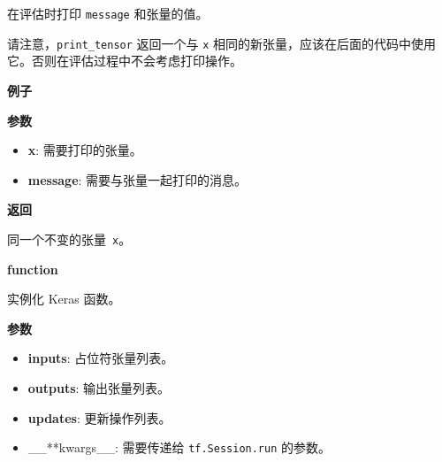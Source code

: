\begin{Shaded}
\begin{Highlighting}[]
\OperatorTok{=}\NormalTok{)}
\end{Highlighting}
\end{Shaded}

在评估时打印 \texttt{message} 和张量的值。

请注意，\texttt{print\_tensor} 返回一个与 \texttt{x}
相同的新张量，应该在后面的代码中使用它。否则在评估过程中不会考虑打印操作。

\textbf{例子}

\begin{Shaded}
\begin{Highlighting}[]
\OperatorTok{>>>} \OperatorTok{=} \OperatorTok{=}\NormalTok{)}
\end{Highlighting}
\end{Shaded}

\textbf{参数}

\begin{itemize}
\tightlist
\item
  \textbf{x}: 需要打印的张量。
\item
  \textbf{message}: 需要与张量一起打印的消息。
\end{itemize}

\textbf{返回}

同一个不变的张量~\texttt{x}。


\textbf{function}\label{function}

\begin{Shaded}
\begin{Highlighting}[]
\OperatorTok{=}\NormalTok{)}
\end{Highlighting}
\end{Shaded}

实例化 Keras 函数。

\textbf{参数}

\begin{itemize}
\tightlist
\item
  \textbf{inputs}: 占位符张量列表。
\item
  \textbf{outputs}: 输出张量列表。
\item
  \textbf{updates}: 更新操作列表。
\item
  \_\_**kwargs\_\_: 需要传递给 \texttt{tf.Session.run} 的参数。
\end{itemize}

